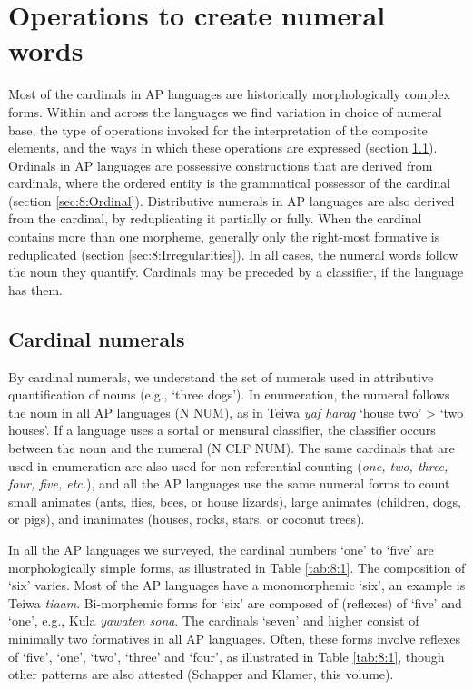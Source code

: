 \documentclass[output=paper]{LSP/langsci}
\begin{document}
\section{Operations to create numeral words} 
\label{sec:8:Operations}
Most of the cardinals in AP languages are historically morphologically complex forms. Within and across the languages we find variation in choice of numeral base, the type of operations invoked for the interpretation of the composite elements, and the ways in which these operations are expressed (section \ref{sec:8:Cardinal}). Ordinals in AP languages are possessive constructions that are derived from cardinals, where the ordered entity is the grammatical possessor of the cardinal (section \ref{sec:8:Ordinal}). Distributive numerals in AP languages are also derived from the cardinal, by reduplicating it partially or fully. When the cardinal contains more than one morpheme, generally only the right-most formative is reduplicated (section \ref{sec:8:Irregularities}).  In all cases, the numeral words follow the noun they quantify. Cardinals may be preceded by a classifier, if the language has them. 

\subsection{Cardinal numerals}
\label{sec:8:Cardinal}
By cardinal numerals, we understand the set of numerals used in attributive quantification of nouns (e.g., `three dogs'). In enumeration, the numeral follows the noun in all AP languages (N NUM), as in Teiwa \textit{yaf haraq} `house two' {\textgreater} `two houses'. If a language uses a sortal or mensural classifier, the classifier occurs between the noun and the numeral (N CLF NUM). The same cardinals that are used in enumeration are also used for non-referential counting (\textit{one, two, three, four, five, etc.}), and all the AP languages use the same numeral forms to count small animates (ants, flies, bees, or house lizards), large animates (children, dogs, or pigs), and inanimates (houses, rocks, stars, or coconut trees).

In all the AP languages we surveyed, the cardinal numbers `one' to `five' are morphologically simple forms, as illustrated in Table \ref{tab:8:1}. The composition of `six' varies. Most of the AP languages have a monomorphemic `six', an example is Teiwa \textit{tiaam}. Bi-morphemic forms for `six' are composed of (reflexes) of `five' and `one', e.g., Kula \textit{yawaten sona}. The cardinals `seven' and higher consist of minimally two formatives in all AP languages. Often, these forms involve reflexes of `five', `one', `two', `three' and `four', as illustrated in Table \ref{tab:8:1}, though other patterns are also attested (Schapper and Klamer, this volume). 
\end{document}
